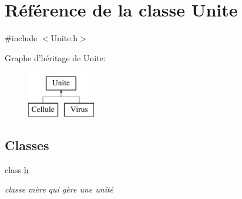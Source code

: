 \hypertarget{classUnite}{
\section{Référence de la classe Unite}
\label{classUnite}
}


{\ttfamily \#include $<$Unite.h$>$}

Graphe d'héritage de Unite:\begin{figure}[H]
\begin{center}
\leavevmode
\includegraphics[height=2.000000cm]{classUnite}
\end{center}
\end{figure}
\subsection*{Classes}
\begin{DoxyCompactItemize}
\item 
class \hyperlink{classUnite_1_1h}{h}
\begin{DoxyCompactList}\small\item\em classe mère qui gère une unité \end{DoxyCompactList}\end{DoxyCompactItemize}
